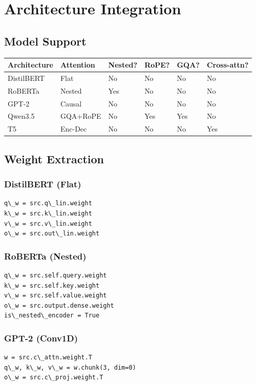 \section{Architecture Integration}

\subsection{Model Support}

\begin{table}[H]
\centering
\small
\begin{tabular}{llllll}
\toprule
\textbf{Architecture} & \textbf{Attention} & \textbf{Nested?} & \textbf{RoPE?} & \textbf{GQA?} & \textbf{Cross-attn?} \\
\midrule
DistilBERT & Flat & No & No & No & No \\
RoBERTa & Nested & Yes & No & No & No \\
GPT-2 & Causal & No & No & No & No \\
Qwen3.5 & GQA+RoPE & No & Yes & Yes & No \\
T5 & Enc-Dec & No & No & No & Yes \\
\bottomrule
\end{tabular}
\end{table}

\subsection{Weight Extraction}

\subsubsection{DistilBERT (Flat)}
\begin{lstlisting}
q\_w = src.q\_lin.weight
k\_w = src.k\_lin.weight
v\_w = src.v\_lin.weight
o\_w = src.out\_lin.weight
\end{lstlisting}

\subsubsection{RoBERTa (Nested)}
\begin{lstlisting}
q\_w = src.self.query.weight
k\_w = src.self.key.weight
v\_w = src.self.value.weight
o\_w = src.output.dense.weight
is\_nested\_encoder = True
\end{lstlisting}

\subsubsection{GPT-2 (Conv1D)}
\begin{lstlisting}
w = src.c\_attn.weight.T
q\_w, k\_w, v\_w = w.chunk(3, dim=0)
o\_w = src.c\_proj.weight.T
\end{lstlisting}

